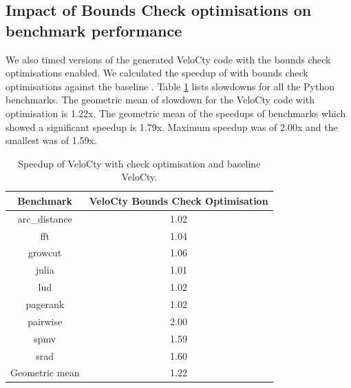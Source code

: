 \subsection{Impact of Bounds Check optimisations on benchmark performance}
We also timed versions of the generated VeloCty code with the bounds check optimisations enabled. We calculated the speedup of \velocty with bounds check optimisations against the baseline \velocty. Table \ref{tab:cwvscopy} lists slowdowns for all the Python benchmarks. The geometric mean of slowdown for the VeloCty code with optimisation is 1.22x. The geometric mean of the speedups of benchmarks which showed a significant speedup is 1.79x. Maximum speedup was of 2.00x and the smallest was of 1.59x. 
\begin{table}[h]
\centering
\begin{tabular}{|c|c|}
\hline
Benchmark      & VeloCty Bounds Check Optimisation \\ \hline
arc\_distance  & 1.02                              \\ \hline
fft            & 1.04                              \\ \hline
growcut        & 1.06                              \\ \hline
julia          & 1.01                              \\ \hline
lud            & 1.02                              \\ \hline
pagerank       & 1.02                              \\ \hline
pairwise       & 2.00                              \\ \hline
spmv           & 1.59                              \\ \hline
srad           & 1.60                              \\ \hline
Geometric mean & 1.22                              \\ \hline
\end{tabular}
\caption{Speedup of VeloCty with check optimisation and baseline VeloCty.}
\label{tab:cwvscopy}
\end{table}
